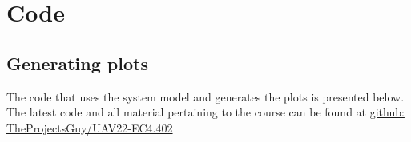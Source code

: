 \section{Code}

\subsection{Generating plots}
\label{app:code-uav-motion}

The code that uses the system model and generates the plots is presented below. 
The latest code and all material pertaining to the course can be found at \href{https://github.com/TheProjectsGuy/UAV22-EC4.402}{github: TheProjectsGuy/UAV22-EC4.402}


